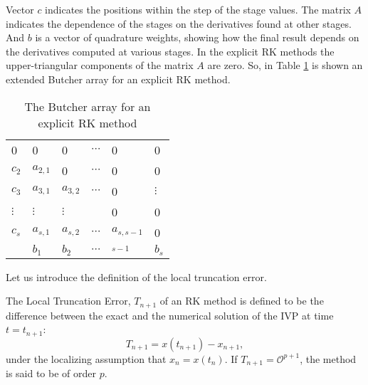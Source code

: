     \noindent Vector $c$ indicates the positions within the step of the 
    stage values. The matrix $A$ indicates the dependence of the stages on the
    derivatives found at other stages. And $b$ is a vector of quadrature weights,
    showing how the final result depends on the derivatives computed at various
    stages. In the explicit RK methods the upper-triangular components of the 
    matrix $A$ are zero. So, in Table \cref{tab:ExplicitBA} is shown an 
    extended Butcher array for an explicit RK method. 
    \begin{table}[h!]\label{tab:ExplicitBA}
        \begin{center}
            \begin{tabular}{l | l l l l l} 
                0     & 0 & 0 & $\cdots$ &0 &    0 \\
                $c_2$     & $a_{2,1}$ & 0 & $\cdots$ &0 & 0 \\
                $c_3$     & $a_{3,1}$ & $a_{3,2}$ & $\cdots$ & 0& $\vdots$ \\
                $\vdots$  & $\vdots$  & $\vdots$  &          &0 & 0 \\
                $c_s$     & $a_{s,1}$ & $a_{s,2}$ & $\cdots$ & $a_{s,s-1}$ & 0 \\
                \hline
                \hspace{0.1cm} & $b_1$ & $b_2$ & $\cdots$ & $_{s-1}$ & $b_s$ \\
            \end{tabular}
            \caption{The Butcher array for an explicit RK method}
        \end{center}
    \end{table}
    Let us introduce the definition of the local truncation error. 
    \begin{definition}
        The Local Truncation Error, $T_{n+1}$ of an RK method is defined to be
        the difference between the exact and the numerical solution of the IVP at
        time $t = t_{n+1}$:
        $$
            T_{n+1} = x(t_{n+1}) - x_{n+1},
        $$
        under the localizing assumption that $x_n = x(t_n)$. If $T_{n+1} = \mathcal{O}^{p+1}$,
        the method is said to be of order $p$.
    \end{definition}
